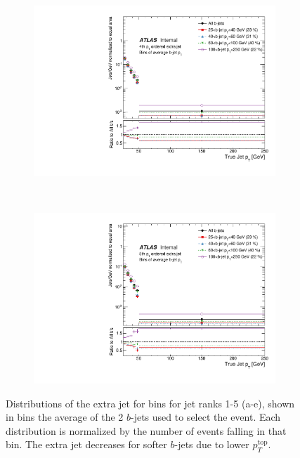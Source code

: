 \begin{figure}
\begin{subfigure}[]{0.33\textwidth}
\end{subfigure}
~
\begin{subfigure}[]{0.33\textwidth}
\includegraphics[width=\textwidth]{fig/TruthNotReco/BJetPtJet3.pdf}
\end{subfigure}
~
\begin{subfigure}[]{0.33\textwidth}
\includegraphics[width=\textwidth]{fig/TruthNotReco/BJetPtJet4.pdf}
\end{subfigure}

\caption{Distributions of the extra jet \pt for bins for jet ranks 1-5 (a-e), shown in bins the average \pt of the 2 $b$-jets used to select the event. Each distribution is normalized by the number of events falling in that bin. The extra jet \pt decreases for softer $b$-jets due to lower $p_{T}^{\textrm{top}}$.}
\label{fig:truebextrapt}
\end{figure}

\clearpage
